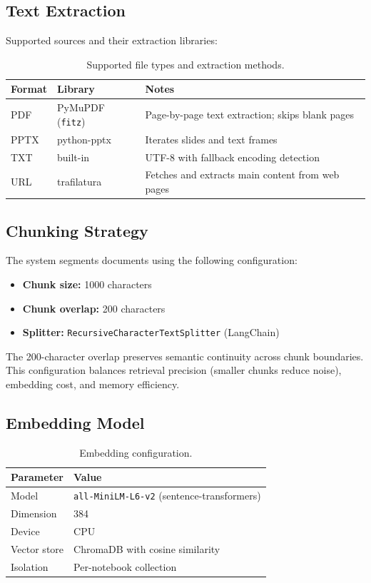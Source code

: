 \documentclass[11pt, letterpaper]{article}
\begin{document}
\subsection{Text Extraction}

Supported sources and their extraction libraries:

\begin{table}[H]
\centering\small
\begin{tabularx}{\textwidth}{@{}l l X@{}}
\toprule
\textbf{Format} & \textbf{Library} & \textbf{Notes} \\
\midrule
PDF  & PyMuPDF (\texttt{fitz}) & Page-by-page text extraction; skips blank pages \\
PPTX & python-pptx             & Iterates slides and text frames \\
TXT  & built-in                & UTF-8 with fallback encoding detection \\
URL  & trafilatura             & Fetches and extracts main content from web pages \\
\bottomrule
\end{tabularx}
\caption{Supported file types and extraction methods.}
\end{table}

\subsection{Chunking Strategy}

The system segments documents using the following configuration:

\begin{itemize}
    \item \textbf{Chunk size:} 1000 characters
    \item \textbf{Chunk overlap:} 200 characters
    \item \textbf{Splitter:} \texttt{RecursiveCharacterTextSplitter} (LangChain)
\end{itemize}

The 200-character overlap preserves semantic continuity across chunk
boundaries.  This configuration balances retrieval precision (smaller chunks
reduce noise), embedding cost, and memory efficiency.

\subsection{Embedding Model}

\begin{table}[H]
\centering\small
\begin{tabularx}{\textwidth}{@{}l X@{}}
\toprule
\textbf{Parameter} & \textbf{Value} \\
\midrule
Model       & \texttt{all-MiniLM-L6-v2} (sentence-transformers) \\
Dimension   & 384 \\
Device      & CPU \\
Vector store & ChromaDB with cosine similarity \\
Isolation   & Per-notebook collection \\
\bottomrule
\end{tabularx}
\caption{Embedding configuration.}
\end{table}
\end{document}
